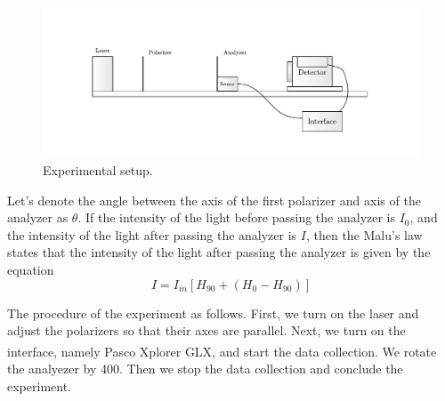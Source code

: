\documentclass[10pt]{article}
\begin{document}
\begin{figure}[ht]
  \centering
  \includegraphics[scale=0.6]{figures/f1.pdf}
  \caption{Experimental setup.}
  \label{fig:1}
\end{figure}

Let's denote the angle between the axis of the first polarizer and axis of the analyzer as $\theta$. If the intensity of the light before passing the analyzer is $I_0$, and the intensity of the light after passing the analyzer is $I$, then the Malu's law states that the intensity of the light after passing the analyzer is given by the equation\cite[]{Hecht_2017}
\begin{equation}
  I = I_{in}\left[H_{90}+\left(H_0-H_{90}\right)\right]
  \label{eq:1}
\end{equation}

The procedure of the experiment as follows. First, we turn on the laser and adjust the polarizers so that their axes are parallel. Next, we turn on the interface, namely Pasco\textsuperscript{\textregistered} Xplorer GLX, and start the data collection. We rotate the analyezer by 400\degree. Then we stop the data collection and conclude the experiment.
\end{document}

